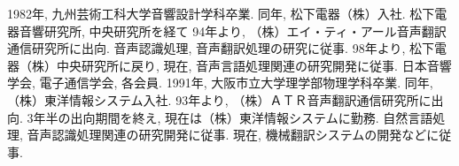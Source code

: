 \begin{biography}

{
1982年, 九州芸術工科大学音響設計学科卒業. 
同年, 松下電器（株）入社. 
松下電器音響研究所, 中央研究所を経て
94年より, （株）エイ・ティ・アール音声翻訳通信研究所に出向. 
音声認識処理, 音声翻訳処理の研究に従事. 
98年より, 松下電器（株）中央研究所に戻り, 
現在, 音声言語処理関連の研究開発に従事. 
日本音響学会, 電子通信学会, 各会員. 
}
{
1991年, 大阪市立大学理学部物理学科卒業. 
同年, （株）東洋情報システム入社. 
93年より, （株）ＡＴＲ音声翻訳通信研究所に出向. 
3年半の出向期間を終え, 現在は（株）東洋情報システムに勤務. 
自然言語処理, 音声認識処理関連の研究開発に従事. 
現在, 機械翻訳システムの開発などに従事. 
}

\end{biography}


